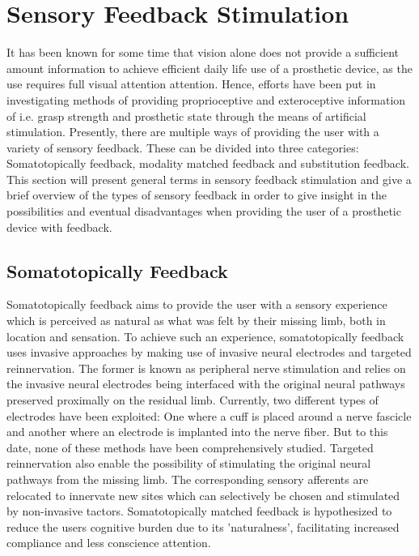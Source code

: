 \section{Sensory Feedback Stimulation} \label{SFS}

It has been known for some time that vision alone does not provide a sufficient amount information to achieve efficient daily life use of a prosthetic device, as the use requires full visual attention attention. Hence, efforts have been put in investigating methods of providing proprioceptive and exteroceptive information of i.e. grasp strength and prosthetic state through the means of artificial stimulation. \cite{Schofield2014,Stephens-Fripp2018} Presently, there are multiple ways of providing the user with a variety of sensory feedback. These can be divided into three categories: Somatotopically feedback, modality matched feedback and substitution feedback. \cite{Schofield2014} \\
This section will present general terms in sensory feedback stimulation and give a brief overview of the types of sensory feedback in order to give insight in the possibilities and eventual disadvantages when providing the user of a prosthetic device with feedback.

\subsection{Somatotopically Feedback}

Somatotopically feedback aims to provide the user with a sensory experience which is perceived as natural as what was felt by their missing limb, both in location and sensation. To achieve such an experience, somatotopically feedback uses invasive approaches by making use of invasive neural electrodes and targeted reinnervation. The former is known as peripheral nerve stimulation and relies on the invasive neural electrodes being interfaced with the original neural pathways preserved proximally on the residual limb. Currently, two different types of electrodes have been exploited: One where a cuff is placed around a nerve fascicle and another where an electrode is implanted into the nerve fiber. But to this date, none of these methods have been comprehensively studied. Targeted reinnervation also enable the possibility of stimulating the original neural pathways from the missing limb. The corresponding sensory afferents are relocated to innervate new sites which can selectively be chosen and stimulated by non-invasive tactors. Somatotopically matched feedback is hypothesized to reduce the users cognitive burden due to its 'naturalness', facilitating increased compliance and less conscience attention. \cite{Schofield2014}  

